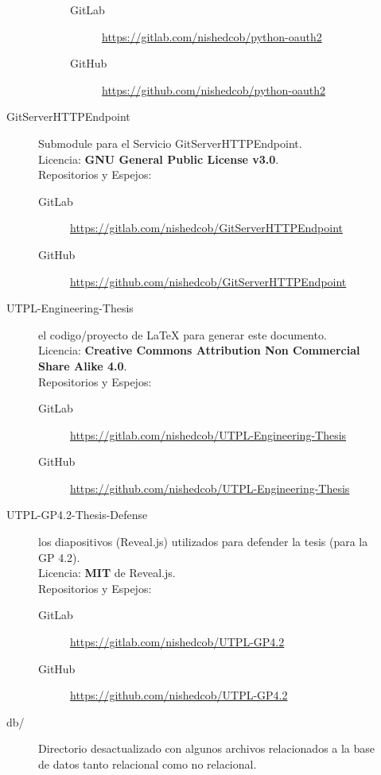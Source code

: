 \begin{description}
\begin{description}
\begin{description}
\begin{description}
                \item[GitLab] \sloppy \url{https://gitlab.com/nishedcob/python-oauth2}
                \item[GitHub] \sloppy \url{https://github.com/nishedcob/python-oauth2}
            \end{description}
        \end{description}
        \item[GitServerHTTPEndpoint] Submodule para el Servicio GitServerHTTPEndpoint. \\
        Licencia: \textbf{GNU General Public License v3.0}. \\
        Repositorios y Espejos:
        \begin{description}
        	\item[GitLab] \sloppy \url{https://gitlab.com/nishedcob/GitServerHTTPEndpoint}
            \item[GitHub] \sloppy \url{https://github.com/nishedcob/GitServerHTTPEndpoint}
        \end{description}
        \item[UTPL-Engineering-Thesis] el codigo/proyecto de LaTeX para generar este documento. \\
        Licencia: \textbf{Creative Commons Attribution Non Commercial Share Alike 4.0}. \\
        Repositorios y Espejos:
        \begin{description}
        	\item[GitLab] \sloppy \url{https://gitlab.com/nishedcob/UTPL-Engineering-Thesis}
            \item[GitHub] \sloppy \url{https://github.com/nishedcob/UTPL-Engineering-Thesis}
        \end{description}
          \item[UTPL-GP4.2-Thesis-Defense] los diapositivos (Reveal.js) utilizados para defender la tesis (para la GP 4.2).\\
        Licencia: \textbf{MIT} de Reveal.js. \\
        Repositorios y Espejos:
        \begin{description}
        	\item[GitLab] \sloppy \url{https://gitlab.com/nishedcob/UTPL-GP4.2}
            \item[GitHub] \sloppy \url{https://github.com/nishedcob/UTPL-GP4.2}
        \end{description}
        \item[db/] Directorio desactualizado con algunos archivos relacionados a la base de datos tanto relacional como no relacional.

\end{description}
\end{description}
